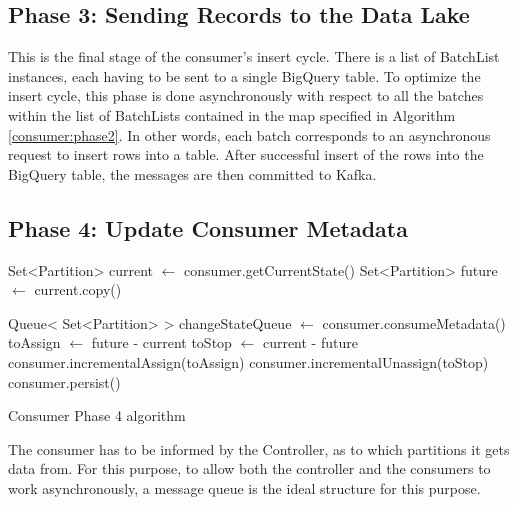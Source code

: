 \subsection{Phase 3: Sending Records to the Data Lake}

This is the final stage of the consumer's insert cycle. There is a list of
BatchList instances, each having to be sent to a single BigQuery table. To
optimize the insert cycle, this phase is done asynchronously with respect to all
the batches within the list of BatchLists contained in the map specified in
Algorithm \ref{consumer:phase2}. In other words, each batch corresponds to an
asynchronous request to insert rows into a table. After successful insert of the
rows into the BigQuery table, the messages are then committed to Kafka. 

\subsection{Phase 4: Update Consumer Metadata}

\IncMargin{1em} 
\begin{algorithm}[h]

    Set<Partition> current $\gets$ consumer.getCurrentState()\; 
    Set<Partition> future $\gets$ current.copy()\;

    Queue< Set<Partition> > changeStateQueue $\gets$ consumer.consumeMetadata()\;
    toAssign $\gets$ future - current\; \label{algo:phase_4_toAssign} 
    toStop $\gets$ current - future\; 
    consumer.incrementalAssign(toAssign)\;
    consumer.incrementalUnassign(toStop)\; \label{algo:phase_4_incremental_assign}
    consumer.persist()\;

\caption{Consumer Phase 4 algorithm} 
\label{algo:phase_4}
\end{algorithm}
\DecMargin{1em}

The consumer has to be informed by the Controller, as to which partitions it
gets data from. For this purpose, to allow both the controller and the consumers
to work asynchronously, a message queue is the ideal structure for this purpose.

